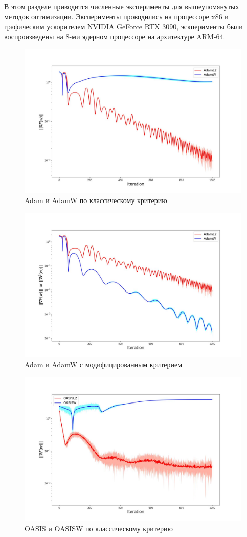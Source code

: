 В этом разделе приводится численные эксперименты для вышеупомянутых методов оптимизации. Эксперименты проводились на процессоре x$86$ и графическим ускорителем NVIDIA GeForce RTX 3090, эскперименты были воспроизведены на 8-ми ядерном процессоре на архитектуре ARM-64.

\begin{figure}[h!]
\centering
\includegraphics[width=0.7\linewidth]{pictures/fig1.jpg}
\captionsetup{justification=centering,margin=0.5cm}
\caption{Adam и AdamW по классическому критерию}
\label{fig:adams_errors}
\end{figure}

\begin{figure}[h!]
\centering
\includegraphics[width=0.7\linewidth]{pictures/fig2.jpg}
\captionsetup{justification=centering,margin=0.5cm}
\caption{Adam и AdamW с модифицированным критерием}
\label{fig:adams_special_errors}
\end{figure}

\begin{figure}[h!]
\centering
\includegraphics[width=0.7\linewidth]{pictures/fig1_oasis.jpg}
\captionsetup{justification=centering,margin=0.5cm}
\caption{OASIS и OASISW по классическому критерию}
\label{fig:oasis_errors}
\end{figure}

